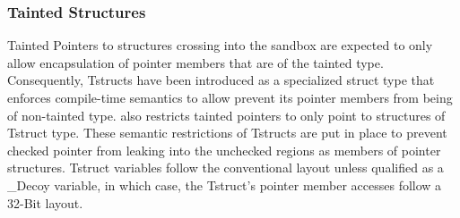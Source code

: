 \subsubsection{\textbf{Tainted Structures}}
Tainted Pointers to structures crossing into the sandbox are expected to only allow encapsulation of pointer members that are of the tainted type. Consequently, Tstructs have been introduced as a specialized struct type that enforces compile-time semantics to allow prevent its pointer members from being of non-tainted type. \systemname also restricts tainted pointers to only point to structures of Tstruct type. These semantic restrictions of Tstructs are put in place to prevent checked pointer from leaking into the unchecked regions as members of pointer structures. Tstruct variables follow the conventional layout unless qualified as a \_Decoy variable, in which case, the Tstruct's pointer member accesses follow a 32-Bit layout. 
